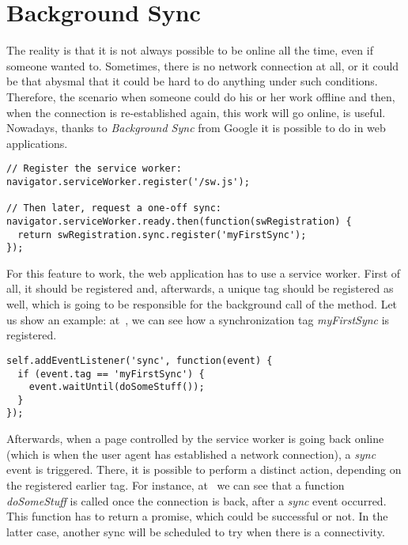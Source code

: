 \section{Background Sync}
\label{BackgroundSync}

The reality is that it is not always possible to be online all the time, even if someone wanted to. Sometimes, there is no network connection at all, or it could be that abysmal that it could be hard to do anything under such conditions. Therefore, the scenario when someone could do his or her work offline and then, when the connection is re-established again, this work will go online, is useful. Nowadays, thanks to \textit{Background Sync}\cite{38} from Google it is possible to do in web applications. 

\begin{lstlisting}[caption={[Code for registration of a sync event for a Service Worker]Code, which demonstrates how to register a sync (\textit{myFirstSync} here) event for the service worker\cite{38}.}, label={lst:tech8}]
// Register the service worker:
navigator.serviceWorker.register('/sw.js');

// Then later, request a one-off sync:
navigator.serviceWorker.ready.then(function(swRegistration) {
  return swRegistration.sync.register('myFirstSync');
});
\end{lstlisting} 

For this feature to work, the web application has to use a service worker. First of all, it should be registered and, afterwards, a unique tag should be registered as well, which is going to be responsible for the background call of the method. Let us show an example: at~, we can see how a synchronization tag \textit{myFirstSync} is registered.

\begin{lstlisting}[caption={[Code for calling a specific function when sync event triggered]Code, which demonstates that a function \textit{doSomeStuff} called, when the \textit{sync} event happened\cite{38}.}, label={lst:tech9}]
self.addEventListener('sync', function(event) {
  if (event.tag == 'myFirstSync') {
    event.waitUntil(doSomeStuff());
  }
});
\end{lstlisting} 

Afterwards, when a page controlled by the service worker is going back online (which is when the user agent has established a network connection\cite{44}), a \textit{sync} event is triggered. There, it is possible to perform a distinct action, depending on the registered earlier tag. For instance, at~ we can see that a function \textit{doSomeStuff} is called once the connection is back, after a \textit{sync} event occurred. This function has to return a promise, which could be successful or not. In the latter case, another sync will be scheduled to try when there is a connectivity\cite{38}. 

